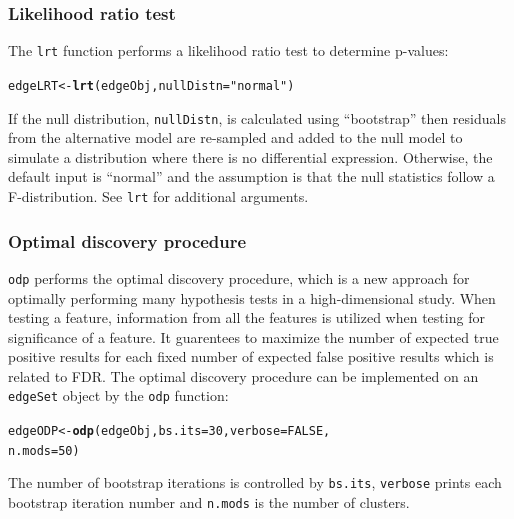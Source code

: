 \documentclass{article}\usepackage[]{graphicx}\usepackage[]{color}
\makeatletter
\newcommand{\hlnum}[1]{\textcolor[rgb]{0.686,0.059,0.569}{#1}}%
\newcommand{\hlstr}[1]{\textcolor[rgb]{0.192,0.494,0.8}{#1}}%
\newcommand{\hlstd}[1]{\textcolor[rgb]{0.345,0.345,0.345}{#1}}%
\newcommand{\hlkwb}[1]{\textcolor[rgb]{0.69,0.353,0.396}{#1}}%
\newcommand{\hlkwc}[1]{\textcolor[rgb]{0.333,0.667,0.333}{#1}}%
\newcommand{\hlkwd}[1]{\textcolor[rgb]{0.737,0.353,0.396}{\textbf{#1}}}%
\newenvironment{kframe}{%
 \def\at@end@of@kframe{}%
 \ifinner\ifhmode%
  \def\at@end@of@kframe{\end{minipage}}%
  \begin{minipage}{\columnwidth}%
 \fi\fi%
 \def\FrameCommand##1{\hskip\@totalleftmargin \hskip-\fboxsep
 \colorbox{shadecolor}{##1}\hskip-\fboxsep
     \hskip-\linewidth \hskip-\@totalleftmargin \hskip\columnwidth}%
 \MakeFramed {\advance\hsize-\width
   \@totalleftmargin\z@ \linewidth\hsize
   \@setminipage}}%
 {\par\unskip\endMakeFramed%
 \at@end@of@kframe}
\newenvironment{knitrout}{}{} %
\makeatother
\begin{document}
\subsubsection{Likelihood ratio test}
The {\tt lrt} function performs a likelihood ratio test to determine p-values:
\begin{knitrout}
\color{fgcolor}\begin{kframe}
\begin{alltt}
\hlstd{edgeLRT} \hlkwb{<-} \hlkwd{lrt}\hlstd{(edgeObj,} \hlkwc{nullDistn} \hlstd{=} \hlstr{"normal"}\hlstd{)}
\end{alltt}
\end{kframe}
\end{knitrout}
If the null distribution, {\tt nullDistn}, is calculated using ``bootstrap'' then residuals from the alternative model are re-sampled and added to the null model to simulate a distribution where there is no differential expression. Otherwise, the default input is ``normal'' and the assumption is that the null statistics follow a F-distribution. See {\tt lrt} for additional arguments.

\subsubsection{Optimal discovery procedure}
{\tt odp} performs the optimal discovery procedure, which is a new approach for optimally performing many hypothesis tests in a high-dimensional study. When testing a feature, information from all the features is utilized when testing for significance of a feature. It guarentees to maximize the number of expected true positive results for each fixed number of expected false positive results which is related to FDR. The optimal discovery procedure can be implemented on an {\tt edgeSet} object by the {\tt odp} function:
\begin{knitrout}
\color{fgcolor}\begin{kframe}
\begin{alltt}
\hlstd{edgeODP} \hlkwb{<-} \hlkwd{odp}\hlstd{(edgeObj,} \hlkwc{bs.its} \hlstd{=} \hlnum{30}\hlstd{,} \hlkwc{verbose} \hlstd{=} \hlnum{FALSE}\hlstd{,}
    \hlkwc{n.mods} \hlstd{=} \hlnum{50}\hlstd{)}
\end{alltt}
\end{kframe}
\end{knitrout}
The number of bootstrap iterations is controlled by {\tt bs.its}, {\tt verbose} prints each bootstrap iteration number and {\tt n.mods} is the number of clusters. 
\end{document}
